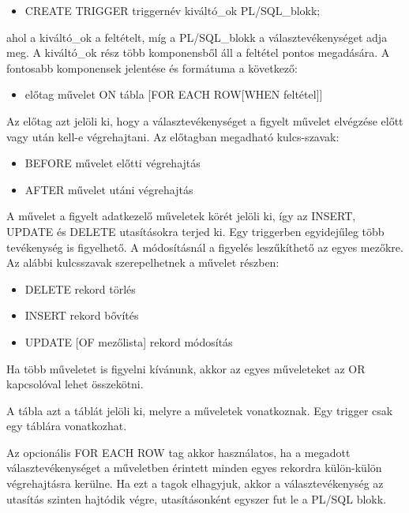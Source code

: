 \documentclass[tikz,12pt,margin=0px]{article}
\begin{document}
    \begin{itemize}
    	\item CREATE TRIGGER triggernév kiváltó\_ok PL/SQL\_blokk;
    \end{itemize}
    ahol a kiváltó\_ok a feltételt, míg a PL/SQL\_blokk a választevékenységet adja meg. A kiváltó\_ok rész több komponensből áll a feltétel pontos megadására. A fontosabb komponensek jelentése és formátuma a következő:
    \begin{itemize}
	   \item előtag	művelet ON tábla [FOR EACH ROW[WHEN feltétel]]
    \end{itemize}
    \noindent Az előtag azt jelöli ki, hogy a választevékenységet a figyelt művelet elvégzése előtt vagy után kell-e végrehajtani.
\newpage
    \noindent Az előtagban megadható kulcs-szavak:
	\begin{itemize}
	   \item BEFORE 		művelet előtti végrehajtás
	   \item AFTER		művelet utáni végrehajtás
    \end{itemize}

    \noindent A művelet a figyelt adatkezelő műveletek körét jelöli ki, így az INSERT, UPDATE és DELETE utasításokra terjed ki. Egy triggerben egyidejűleg több tevékenység is figyelhető. A módosításnál a figyelés leszűkíthető az egyes mezőkre. \\

    \noindent Az alábbi kulcsszavak szerepelhetnek a művelet részben:
    \begin{itemize}
	   \item DELETE			rekord törlés
	   \item INSERT			rekord bővítés
	   \item UPDATE [OF mezőlista]	rekord módosítás
    \end{itemize}

    \noindent Ha több műveletet is figyelni kívánunk, akkor az egyes műveleteket az OR kapcsolóval lehet összekötni.

    \noindent A tábla azt a táblát jelöli ki, melyre a műveletek vonatkoznak. Egy trigger csak egy táblára vonatkozhat.

    \noindent Az opcionális FOR EACH ROW tag akkor használatos, ha a megadott választevékenységet a műveletben érintett minden egyes rekordra külön-külön végrehajtásra kerülne. Ha ezt a tagok elhagyjuk, akkor a választevékenység az utasítás szinten hajtódik végre, utasításonként egyszer fut le a PL/SQL blokk.\\
\end{document}
